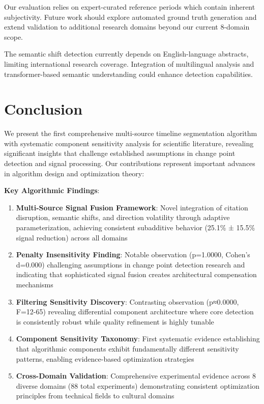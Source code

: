 \documentclass[conference]{IEEEtran}
\begin{document}
Our evaluation relies on expert-curated reference periods which contain inherent subjectivity. Future work should explore automated ground truth generation and extend validation to additional research domains beyond our current 8-domain scope.

The semantic shift detection currently depends on English-language abstracts, limiting international research coverage. Integration of multilingual analysis and transformer-based semantic understanding could enhance detection capabilities.

\section{Conclusion}

We present the first comprehensive multi-source timeline segmentation algorithm with systematic component sensitivity analysis for scientific literature, revealing significant insights that challenge established assumptions in change point detection and signal processing. Our contributions represent important advances in algorithm design and optimization theory:

\textbf{Key Algorithmic Findings}:
\begin{enumerate}
\item \textbf{Multi-Source Signal Fusion Framework}: Novel integration of citation disruption, semantic shifts, and direction volatility through adaptive parameterization, achieving consistent subadditive behavior (25.1\% ± 15.5\% signal reduction) across all domains
\item \textbf{Penalty Insensitivity Finding}: Notable observation (p=1.0000, Cohen's d=0.000) challenging assumptions in change point detection research and indicating that sophisticated signal fusion creates architectural compensation mechanisms
\item \textbf{Filtering Sensitivity Discovery}: Contrasting observation (p≈0.0000, F=12-65) revealing differential component architecture where core detection is consistently robust while quality refinement is highly tunable
\item \textbf{Component Sensitivity Taxonomy}: First systematic evidence establishing that algorithmic components exhibit fundamentally different sensitivity patterns, enabling evidence-based optimization strategies
\item \textbf{Cross-Domain Validation}: Comprehensive experimental evidence across 8 diverse domains (88 total experiments) demonstrating consistent optimization principles from technical fields to cultural domains
\end{enumerate}
\end{document}

